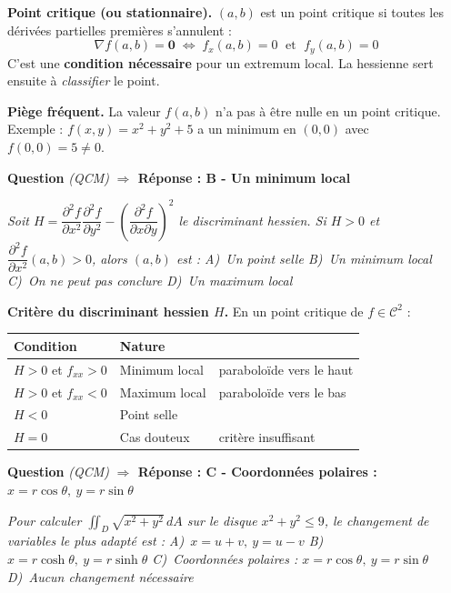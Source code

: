 \documentclass[11pt,a4paper]{article}
\newcounter{qnum}
\newcommand{\qtitre}[2]{%
  \stepcounter{qnum}%
  \medskip\noindent
  \textbf{\color{bleutexte}Question \theqnum}\enspace
  \textit{(#1)}\enspace
  \textcolor{vertok}{\textbf{$\Rightarrow$ Réponse : #2}}
  \par\smallskip
}
\newcommand{\qenonce}[1]{%
  \begin{mdframed}[backgroundcolor=grisbox, linewidth=0pt,
    innerleftmargin=8pt, innerrightmargin=8pt,
    innertopmargin=5pt, innerbottommargin=5pt,
    skipabove=2pt, skipbelow=4pt]
  \small\textit{#1}
  \end{mdframed}
}
\begin{document}
\begin{methodebox}
\textbf{Point critique (ou stationnaire).} $(a,b)$ est un point critique si toutes les dérivées partielles premières s'annulent :
$$\nabla f(a,b) = \mathbf{0} \;\Longleftrightarrow\; f_x(a,b) = 0 \;\text{ et }\; f_y(a,b) = 0$$
C'est une \textbf{condition nécessaire} pour un extremum local. La hessienne sert ensuite à \emph{classifier} le point.
\end{methodebox}

\begin{piegebox}
\textbf{Piège fréquent.} La valeur $f(a,b)$ n'a pas à être nulle en un point critique. Exemple : $f(x,y)=x^2+y^2+5$ a un minimum en $(0,0)$ avec $f(0,0)=5\neq 0$.
\end{piegebox}

\qtitre{QCM}{B - Un minimum local}
\qenonce{Soit $H = \dfrac{\partial^2 f}{\partial x^2}\dfrac{\partial^2 f}{\partial y^2} - \!\left(\dfrac{\partial^2 f}{\partial x\partial y}\right)^{\!2}$ le discriminant hessien.
Si $H > 0$ et $\dfrac{\partial^2 f}{\partial x^2}(a,b) > 0$, alors $(a,b)$ est :
\quad A)~Un point selle
\quad B)~Un minimum local
\quad C)~On ne peut pas conclure
\quad D)~Un maximum local}

\begin{methodebox}
\textbf{Critère du discriminant hessien $H$.} En un point critique de $f\in\mathcal{C}^2$ :
\begin{center}
\begin{tabular}{@{}lll@{}}
\toprule
Condition & Nature & \\
\midrule
$H > 0$ et $f_{xx} > 0$ & Minimum local & paraboloïde vers le haut \\
$H > 0$ et $f_{xx} < 0$ & Maximum local & paraboloïde vers le bas \\
$H < 0$                 & Point selle   & \\
$H = 0$                 & Cas douteux   & critère insuffisant \\
\bottomrule
\end{tabular}
\end{center}
\end{methodebox}

\qtitre{QCM}{C - Coordonnées polaires : $x=r\cos\theta,\ y=r\sin\theta$}
\qenonce{Pour calculer $\displaystyle\iint_D \sqrt{x^2+y^2}\,dA$ sur le disque $x^2+y^2\leq 9$, le changement de variables le plus adapté est :
\quad A)~$x=u+v,\ y=u-v$
\quad B)~$x=r\cosh\theta,\ y=r\sinh\theta$
\quad C)~Coordonnées polaires : $x=r\cos\theta,\ y=r\sin\theta$
\quad D)~Aucun changement nécessaire}
\end{document}
